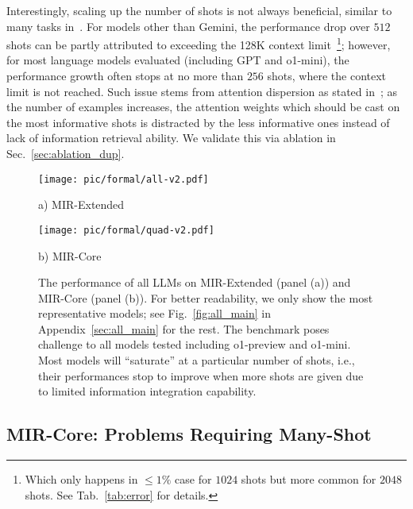 Interestingly, scaling up the number of shots is not always beneficial, similar to many tasks in~\citet{agarwal2024many}. For models other than Gemini, the performance drop over $512$ shots can be partly attributed to exceeding the 128K context limit~\footnote{Which only happens in $\leq 1\%$ case for $1024$ shots but more common for $2048$ shots. See Tab.~\ref{tab:error} for details.}; however, for most language models evaluated (including GPT and o1-mini), the performance growth often stops at no more than $256$ shots, where the context limit is not reached. Such issue stems from attention dispersion as stated in~\citet{yuan2024focused}; as the number of examples increases, the attention weights which should be cast on the most informative shots is distracted by the less informative ones instead of lack of information retrieval ability. We validate this via ablation in Sec.~\ref{sec:ablation_dup}.



\begin{figure}[ht]
    \centering
    \begin{minipage}[c]{0.4\linewidth}
        \centering
        \texttt{[image: pic/formal/all-v2.pdf]}
        \caption*{a) MIR-Extended}
    \end{minipage}
    \hfill
    \begin{minipage}[c]{0.55\linewidth}
        \centering
        \texttt{[image: pic/formal/quad-v2.pdf]}
        \caption*{b) MIR-Core}
    \end{minipage}
    
    \caption{The performance of all LLMs on MIR-Extended (panel (a)) and MIR-Core (panel (b)). For better readability, we only show the most representative models; see Fig.~\ref{fig:all_main} in Appendix~\ref{sec:all_main} for the rest. The benchmark poses challenge to all models tested including o1-preview and o1-mini. Most models will ``saturate'' at a particular number of shots, i.e., their performances stop to improve when more shots are given due to limited information integration capability.}
    \label{fig:main}
\end{figure}



\label{sec:main}

\subsection{MIR-Core: Problems Requiring Many-Shot} %
\label{sec:discr}

